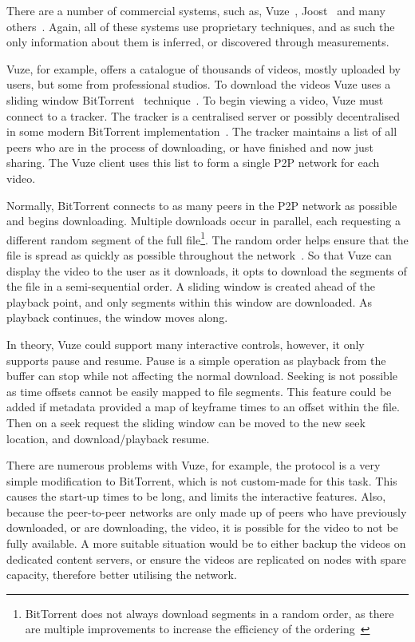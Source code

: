    There are a number of commercial systems, such as, Vuze~\cite{vuze}, Joost~\cite{joost} and many others~\cite{gridcast,pfsvod,ppstream,uusee}. Again, all of these systems use proprietary techniques, and as such the only information about them is inferred, or discovered through measurements.

    Vuze, for example, offers a catalogue of thousands of videos, mostly uploaded by users, but some from professional studios. To download the videos Vuze uses a sliding window BitTorrent~\cite{cohen03ibr} technique~\cite{vlavianos2006beb,shah2007ppm}. To begin viewing a video, Vuze must connect to a tracker. The tracker is a centralised server or possibly decentralised in some modern BitTorrent implementation~\cite{roozenburg2006sds}. The tracker maintains a list of all peers who are in the process of downloading, or have finished and now just sharing. The Vuze client uses this list to form a single P2P network for each video.

    Normally, BitTorrent connects to as many peers in the P2P network as possible and begins downloading. Multiple downloads occur in parallel, each requesting a different random segment of the full file\footnote{BitTorrent does not always download segments in a random order, as there are multiple improvements to increase the efficiency of the ordering~\cite{massoulie2005crs}}. The random order helps ensure that the file is spread as quickly as possible throughout the network~\cite{bharambe2005aai}. So that Vuze can display the video to the user as it downloads, it opts to download the segments of the file in a semi-sequential order. A sliding window is created ahead of the playback point, and only segments within this window are downloaded. As playback continues, the window moves along.

    In theory, Vuze could support many interactive controls, however, it only supports pause and resume. Pause is a simple operation as playback from the buffer can stop while not affecting the normal download. Seeking is not possible as time offsets cannot be easily mapped to file segments.  This feature could be added if metadata provided a map of keyframe times to an offset within the file. Then on a seek request the sliding window can be moved to the new seek location, and download/playback resume.

    There are numerous problems with Vuze, for example, the protocol is a very simple modification to BitTorrent, which is not custom-made for this task. This causes the start-up times to be long, and limits the interactive features. Also, because the peer-to-peer networks are only made up of peers who have previously downloaded, or are downloading, the video, it is possible for the video to not be fully available. A more suitable situation would be to either backup the videos on dedicated content servers, or ensure the videos are replicated on nodes with spare capacity, therefore better utilising the network.

